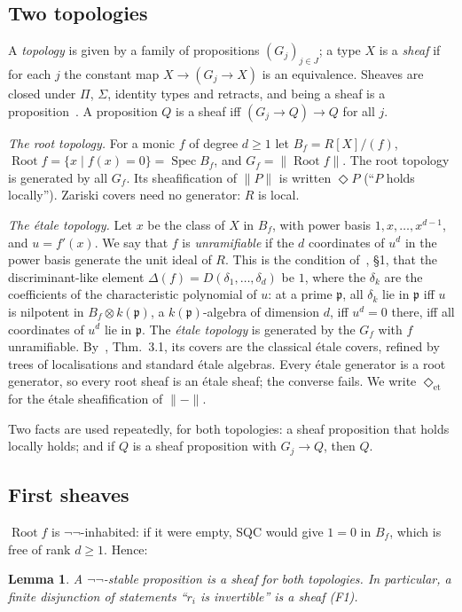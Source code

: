 \documentclass[11pt]{amsart}
\newtheorem{lemma}[theorem]{Lemma}
\theoremstyle{definition}
\theoremstyle{remark}
\newcommand{\Spec}{\operatorname{Spec}}
\newcommand{\Root}{\operatorname{Root}}
\newcommand{\close}{\Diamond}
\newcommand{\closeE}{\Diamond_{\mathrm{et}}}
\newcommand{\tr}[1]{\|#1\|}
\begin{document}
\subsection{Two topologies}
A \emph{topology} is given by a family of propositions $(G_j)_{j\in J}$; a
type $X$ is a \emph{sheaf} if for each $j$ the constant map
$X\to(G_j\to X)$ is an equivalence. Sheaves are closed under $\Pi$,
$\Sigma$, identity types and retracts, and being a sheaf is a
proposition~\cite{RSS}. A proposition $Q$ is a sheaf iff $(G_j\to Q)\to Q$
for all $j$.

\emph{The root topology.} For a monic $f$ of degree $d\geq1$ let
$B_f=R[X]/(f)$, $\Root f=\{x\mid f(x)=0\}=\Spec B_f$, and
$G_f=\tr{\Root f}$. The root topology is generated by all $G_f$. Its
sheafification of $\tr P$ is written $\close P$ (``$P$ holds
locally''). Zariski covers need no generator: $R$ is local.

\emph{The \'etale topology.} Let $x$ be the class of $X$ in $B_f$, with
power basis $1,x,\dots,x^{d-1}$, and $u=f'(x)$. We say that $f$ is
\emph{unramifiable} if the $d$ coordinates of $u^d$ in the power basis
generate the unit ideal of $R$. This is the condition of~\cite{CLN}, \S1,
that the discriminant-like element $\Delta(f)=D(\delta_1,\dots,\delta_d)$
be $1$, where the $\delta_k$ are the coefficients of the characteristic
polynomial of $u$: at a prime $\mathfrak p$, all $\delta_k$ lie in
$\mathfrak p$ iff $u$ is nilpotent in $B_f\otimes k(\mathfrak p)$, a
$k(\mathfrak p)$-algebra of dimension $d$, iff $u^d=0$ there, iff all
coordinates of $u^d$ lie in $\mathfrak p$. The \emph{\'etale topology} is
generated by the $G_f$ with $f$ unramifiable. By~\cite{CLN}, Thm.~3.1, its
covers are the classical \'etale covers, refined by trees of
localisations and standard \'etale algebras. Every \'etale generator is a
root generator, so every root sheaf is an \'etale sheaf; the converse
fails. We write $\closeE$ for the \'etale sheafification of $\tr{-}$.

Two facts are used repeatedly, for both topologies: a sheaf proposition
that holds locally holds; and if $Q$ is a sheaf proposition with
$G_j\to Q$, then $Q$.

\subsection{First sheaves}
$\Root f$ is $\neg\neg$-inhabited: if it were empty, SQC would give $1=0$
in $B_f$, which is free of rank $d\geq1$. Hence:

\begin{lemma}\label{l:negneg}
A $\neg\neg$-stable proposition is a sheaf for both topologies. In
particular, a finite disjunction of statements ``$r_i$ is invertible'' is
a sheaf (F1).
\end{lemma}
\end{document}
